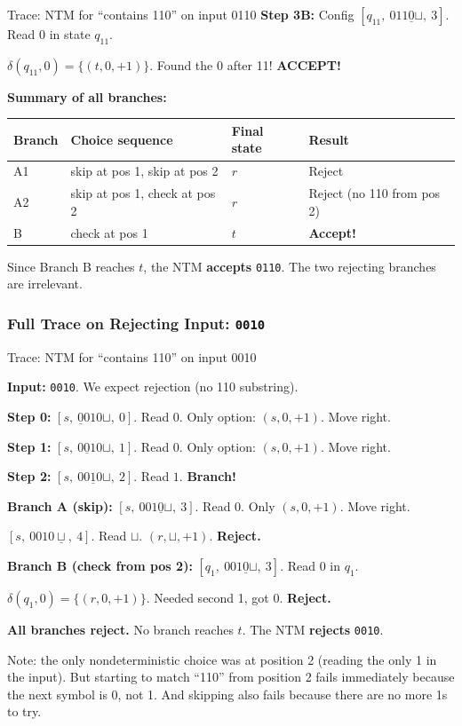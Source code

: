 \documentclass[11pt,a4paper]{article}
\begin{document}
\begin{examplebox}{{Trace: NTM for ``contains 110'' on input 0110}}
\quad \textbf{Step 3B:} Config $[q_{11},\ 011\underline{0}\sqcup,\ 3]$. Read $0$ in state $q_{11}$.

\quad $\delta(q_{11}, 0) = \{(t, 0, +1)\}$. Found the 0 after 11! \textbf{ACCEPT!}

\bigskip
\textbf{Summary of all branches:}
\begin{center}
\begin{tabular}{llll}
\toprule
Branch & Choice sequence & Final state & Result \\
\midrule
A1 & skip at pos 1, skip at pos 2 & $r$ & Reject \\
A2 & skip at pos 1, check at pos 2 & $r$ & Reject (no 110 from pos 2) \\
B & check at pos 1 & $t$ & \textbf{Accept!} \\
\bottomrule
\end{tabular}
\end{center}

Since Branch B reaches $t$, the NTM \textbf{accepts} \texttt{0110}. The two rejecting branches are irrelevant.
\end{examplebox}

\subsubsection{Full Trace on Rejecting Input: \texttt{0010}}

\begin{examplebox}{{Trace: NTM for ``contains 110'' on input 0010}}

\textbf{Input:} \texttt{0010}. We expect rejection (no 110 substring).

\textbf{Step 0:} $[s,\ \underline{0}010\sqcup,\ 0]$. Read $0$. Only option: $(s, 0, +1)$. Move right.

\textbf{Step 1:} $[s,\ 0\underline{0}10\sqcup,\ 1]$. Read $0$. Only option: $(s, 0, +1)$. Move right.

\textbf{Step 2:} $[s,\ 00\underline{1}0\sqcup,\ 2]$. Read $1$. \textbf{Branch!}

\textbf{Branch A (skip):} $[s,\ 001\underline{0}\sqcup,\ 3]$. Read $0$. Only $(s, 0, +1)$. Move right.

\quad $[s,\ 0010\underline{\sqcup},\ 4]$. Read $\sqcup$. $(r, \sqcup, +1)$. \textbf{Reject.}

\textbf{Branch B (check from pos 2):} $[q_1,\ 001\underline{0}\sqcup,\ 3]$. Read $0$ in $q_1$.

\quad $\delta(q_1, 0) = \{(r, 0, +1)\}$. Needed second 1, got 0. \textbf{Reject.}

\textbf{All branches reject.} No branch reaches $t$. The NTM \textbf{rejects} \texttt{0010}.

Note: the only nondeterministic choice was at position 2 (reading the only 1 in the input). But starting to match ``110'' from position 2 fails immediately because the next symbol is 0, not 1. And skipping also fails because there are no more 1s to try.
\end{examplebox}
\end{document}
